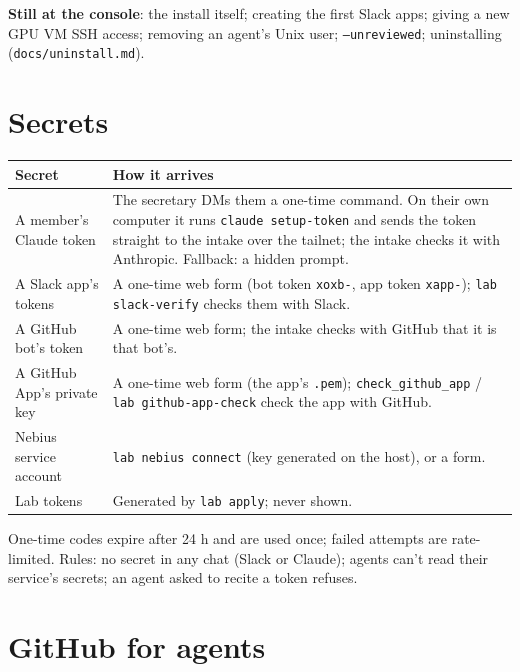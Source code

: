 \documentclass[11pt]{article}
\newcommand{\code}[1]{\texttt{#1}}
\begin{document}
\textbf{Still at the console}: the install itself; creating the first Slack apps; giving a
new GPU VM SSH access; removing an agent's Unix user; \code{--unreviewed}; uninstalling
(\code{docs/uninstall.md}).

\section{Secrets}

\begin{tabularx}{\linewidth}{lL}
\toprule
Secret & How it arrives \\
\midrule
A member's Claude token & The secretary DMs them a one-time command. On their own computer
  it runs \code{claude setup-token} and sends the token straight to the intake over the
  tailnet; the intake checks it with Anthropic. Fallback: a hidden prompt. \\
A Slack app's tokens & A one-time web form (bot token \code{xoxb-}, app token
  \code{xapp-}); \code{lab slack-verify} checks them with Slack. \\
A GitHub bot's token & A one-time web form; the intake checks with GitHub that it is that
  bot's. \\
A GitHub App's private key & A one-time web form (the app's \code{.pem});
  \code{check\_github\_app} / \code{lab github-app-check} check the app with GitHub. \\
Nebius service account & \code{lab nebius connect} (key generated on the host), or a form. \\
Lab tokens & Generated by \code{lab apply}; never shown. \\
\bottomrule
\end{tabularx}

\medskip
One-time codes expire after 24 h and are used once; failed attempts are rate-limited.
Rules: no secret in any chat (Slack or Claude); agents can't read their service's secrets;
an agent asked to recite a token refuses.

\section{GitHub for agents}\label{sec:github}
\end{document}
